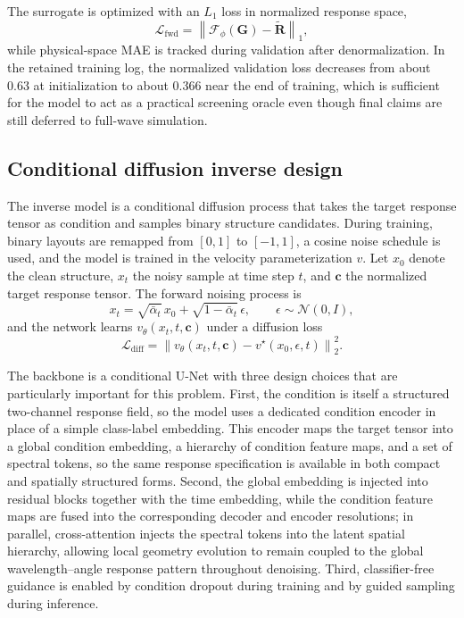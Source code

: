 The surrogate is optimized with an $L_1$ loss in normalized response space,
\begin{equation}
\mathcal{L}_{\mathrm{fwd}}=\left\|\mathcal{F}_{\phi}(\mathbf{G})-\widetilde{\mathbf{R}}\right\|_{1},
\end{equation}
while physical-space MAE is tracked during validation after denormalization. In the retained training log, the normalized validation loss decreases from about $0.63$ at initialization to about $0.366$ near the end of training, which is sufficient for the model to act as a practical screening oracle even though final claims are still deferred to full-wave simulation.

\subsection{Conditional diffusion inverse design}

The inverse model is a conditional diffusion process that takes the target response tensor as condition and samples binary structure candidates. During training, binary layouts are remapped from $[0,1]$ to $[-1,1]$, a cosine noise schedule is used, and the model is trained in the velocity parameterization $v$. Let $x_0$ denote the clean structure, $x_t$ the noisy sample at time step $t$, and $\mathbf{c}$ the normalized target response tensor. The forward noising process is
\begin{equation}
x_t=\sqrt{\bar{\alpha}_t}\,x_0+\sqrt{1-\bar{\alpha}_t}\,\epsilon,\qquad \epsilon\sim\mathcal{N}(0,I),
\end{equation}
and the network learns $v_{\theta}(x_t,t,\mathbf{c})$ under a diffusion loss
\begin{equation}
\mathcal{L}_{\mathrm{diff}}=\left\|v_{\theta}(x_t,t,\mathbf{c})-v^{\star}(x_0,\epsilon,t)\right\|_2^2.
\end{equation}

The backbone is a conditional U-Net with three design choices that are particularly important for this problem. First, the condition is itself a structured two-channel response field, so the model uses a dedicated condition encoder in place of a simple class-label embedding. This encoder maps the target tensor into a global condition embedding, a hierarchy of condition feature maps, and a set of spectral tokens, so the same response specification is available in both compact and spatially structured forms. Second, the global embedding is injected into residual blocks together with the time embedding, while the condition feature maps are fused into the corresponding decoder and encoder resolutions; in parallel, cross-attention injects the spectral tokens into the latent spatial hierarchy, allowing local geometry evolution to remain coupled to the global wavelength--angle response pattern throughout denoising. Third, classifier-free guidance is enabled by condition dropout during training and by guided sampling during inference.

